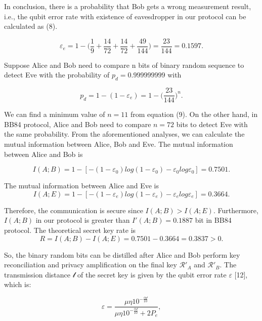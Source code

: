 \documentclass[a4paper,11pt]{article}
\begin{document}
In conclusion, there is a probability that Bob gets a wrong measurement result, i.e., the qubit error rate with existence of eavesdropper in our protocol can be calculated as (8).

\begin{equation*}
\varepsilon_e = 1 - \Big(\dfrac{1}{9} + \dfrac{14}{72} + \dfrac{14}{72} + \dfrac{49}{144} \Big) = \dfrac{23}{144} = 0.1597.
\end{equation*}

Suppose Alice and Bob need to compare n bits of binary random sequence to detect Eve with the probability of $p_d = 0.999999999$ with

\begin{equation*}
p_d = 1 - (1-\varepsilon_e) = 1 - \Big(\dfrac{23}{144} \Big)^n.
\end{equation*}

We can find a minimum value of $n = 11$ from equation (9). On the other hand, in BB84 protocol, Alice and Bob need to compare $n = 72$ bits to detect Eve with the same probability. From the aforementioned analyses, we can calculate the mutual information between Alice, Bob and Eve. The mutual information between Alice and Bob is

\begin{equation*}
I(A; B) = 1 - [-(1-\varepsilon_0)log(1-\varepsilon_0) - \varepsilon_0 log \varepsilon_0] = 0.7501.
\end{equation*}

The mutual information between Alice and Eve is 
\begin{equation*}
I(A; E) = 1 - [-(1-\varepsilon_e)log(1-\varepsilon_e) - \varepsilon_e log \varepsilon_e] = 0.3664.
\end{equation*}

Therefore, the communication is secure since $I(A; B) > I(A; E)$. Furthermore, $I(A; B)$ in our protocol is greater than $I' (A; B) = 0.1887$ bit in BB84 protocol.
The theoretical secret key rate is
\begin{equation*}
R = I(A; B) - I(A; E) = 0.7501 - 0.3664 = 0.3837 > 0.
\end{equation*}

So, the binary random bits can be distilled after Alice and Bob perform key reconciliation and privacy amplification on the final key $\mathcal{R}'_A$ and $\mathcal{R}'_B$. The transmission distance $\mathcal{l}$ of the secret key is given by the qubit error rate $\varepsilon$ [12], which is:

\begin{equation*}
\varepsilon = \dfrac{\mu \eta 10^{- \frac{\alpha \mathcal{l}}{10}}}{\mu \eta 10^{- \frac{\alpha \mathcal{l}}{10}} + 2P_e}, 
\end{equation*}
\end{document}
